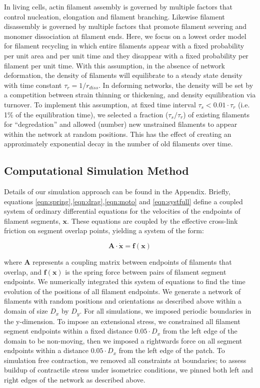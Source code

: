 \documentclass[10pt,letterpaper]{article}
\begin{document}
In living cells, actin filament assembly is governed by multiple factors that control nucleation, elongation and filament branching. Likewise filament disassembly is governed by multiple factors that promote filament severing and monomer dissociation at filament ends. Here, we focus on a lowest order model for filament recycling in which entire filaments appear with a fixed probability per unit area and per unit time and they disappear with a fixed probability per filament per unit time. With this assumption, in the absence of network deformation, the density of filaments will equilibrate to a steady state density with time constant $\tau_r = 1/r_{diss}$.   In deforming networks, the density will be set by a competition between strain thinning or thickening, and density equilibration via turnover. To implement this assumption, at fixed time interval $\tau_s < 0.01\cdot\tau_r$ (i.e. 1\% of the equilibration time), we selected a fraction ($\tau_s/\tau_r$) of existing filaments for “degredation” and allowed (number) new unstrained filaments to appear within the network at random positions. This has the effect of creating an  approximately exponential decay in the number of old filaments over time.


\subsection*{Computational Simulation Method}

Details of our simulation approach can be found in the Appendix. Briefly, equations \ref{eqn:spring},\ref{eqn:drag},\ref{eqn:moto} and \ref{eqn:systfull} define a coupled system of ordinary differential equations for the velocities of the endpoints of filament segments, $\mathbf{x}$.  These equations are coupled by the effective cross-link friction on segment overlap points, yielding a system of the form:

\begin{equation}
\mathbf{A \cdot \dot x} = \mathbf{f(x)}
\end{equation}

where $\mathbf{A }$ represents a coupling matrix between endpoints of filaments that overlap, and $\mathbf{f(x)}$ is the spring force between pairs of filament segment endpoints.   We numerically integrated this system of equations to find the time evolution of the positions of all filament endpoints. We generate a network of filaments with random positions and orientations as described above within a domain of size $D_x$ by $D_y$.  For all simulations, we imposed periodic boundaries in the y-dimension. To impose an extensional stress, we constrained all filament segment endpoints within a fixed distance $0.05\cdot D_x$ from the left edge of the domain to be non-moving, then we imposed a rightwards force on all segment endpoints within a distance $0.05\cdot D_x$ from the left edge of the patch.   To simulation free contraction, we removed all constraints at boundaries; to assess buildup of contractile stress under isometricc conditions, we pinned both left and right edges of the network as described above.
\end{document}

